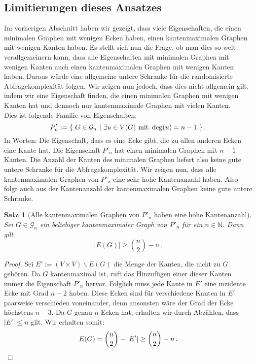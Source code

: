 \documentclass[10pt,a4paper]{scrreprt}
\newtheorem{Satz}[definition]{Satz}
\theoremstyle{definition}
\begin{document}
\subsection{Limitierungen dieses Ansatzes}
Im vorherigen Abschnitt haben wir gezeigt, dass viele Eigenschaften,
die einen  minimalen Graphen mit wenigen Ecken haben, einen kantenmaximalen
Graphen mit wenigen Kanten haben. Es stellt sich nun die Frage,
ob man dies so weit verallgemeinern kann, dass alle Eigenschaften
mit minimalen Graphen mit wenigen Kanten auch einen kantenmaximalen
Graphen mit wenigen Kanten haben. Daraus würde eine allgemeine
untere Schranke für die randomisierte Abfragekomplexität folgen.
Wir zeigen nun jedoch, dass dies nicht allgemein gilt, indem wir
eine Eigenschaft finden, die einen minimalen Graphen mit wenigen
Kanten hat und dennoch nur kantenmaximale Graphen mit vielen Kanten. \\
Dies ist folgende Familie von Eigenschaften:
$$ P'_n := \{ \ G \in \mathcal{G}_n \ 
| \ \exists u\in V(G) \textup{ mit } \deg(u) = n-1 \ \}\,.$$
In Worten: Die Eigenschaft, dass es eine Ecke gibt,
die zu allen anderen Ecken eine Kante hat.
Die Eigenschaft $P'_n$ hat einen minimalen Graphen mit
$n-1$ Kanten. Die Anzahl der Kanten des minimalen Graphen
liefert also keine gute untere Schranke für die Abfragekomplexität.
Wir zeigen nun, dass alle kantenmaximalen Graphen von $P'_n$
eine sehr hohe Kantenanzahl haben. Also folgt auch aus der Kantenanzahl
der kantenmaximalen Graphen keine gute untere Schranke.
\begin{Satz}[Alle kantenmaximalen Graphen von $P'_n$ 
             haben eine hohe Kantenanzahl]
Sei $G\in \mathcal{G}_n$ ein beliebiger kantenmaximaler Graph
von $P'_n$ für ein $n\in \mathbb{N}$. Dann gilt
$$ |E(G)| \geq \binom{n}{2} - n\,.$$
\end{Satz}
\begin{proof}
Sei $E' := (V \times V) \backslash E(G)$ die Menge der Kanten, die nicht
zu $G$ gehören. Da $G$ kantenmaximal ist, ruft das Hinzufügen
einer dieser Kanten immer die Eigenschaft $P'_n$ hervor.
Folglich muss jede Kante in $E'$ eine inzidente Ecke mit Grad
$n-2$ haben. Diese Ecken sind für verschiedene Kanten in $E'$
paarweise verschieden voneinander, denn ansonsten wäre der
Grad der Ecke höchstens $n-3$. Da $G$ genau $n$ Ecken hat,
erhalten wir durch Abzählen, dass $|E'| \leq n$ gilt.
Wir erhalten somit:
\begin{equation*}
E(G) = \binom{n}{2} - |E'| \geq \binom{n}{2} - n\,. \qedhere
\end{equation*}
\end{proof}
\end{document}
